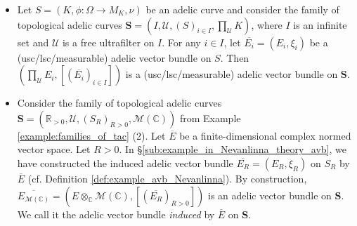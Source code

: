 \documentclass [11pt,reqno]{amsart}
\def\bC{{\mathbb{C}}}
\def\bR{{\mathbb{R}}}
\newcommand{\1}{\mathmybb{1}}
\def\cM{{\mathcal{M}}}
\def\cU{{\mathcal{U}}}
\begin{document}
\begin{example}
\label{example:adelic_vector_bundles_families_tac}
\begin{itemize}
	\item[(1)] Let $S=(K,\phi:\Omega\to M_{K},\nu)$ be an adelic curve and consider the family of topological adelic curves $\mathbf{S}=(I,\cU,(S)_{i\in I},\prod_{\cU}K)$, where $I$ is an infinite set and $\cU$ is a free ultrafilter on $I$. For any $i\in I$, let $\overline{E_{i}}=(E_{i},\xi_{i})$ be a (usc/lsc/measurable) adelic vector bundle on $S$. Then $(\prod_{\cU}E_{i},[(\overline{E_{i}})_{i\in I}])$ is a (usc/lsc/measurable) adelic vector bundle on $\mathbf{S}$.
	\item[(2)] Consider the family of topological adelic curves $\mathbf{S}=(\bR_{>0},\cU,(S_{R})_{R>0},\cM(\bC))$ from Example \ref{example:families_of_tac} (2). Let $\overline{E}$ be a finite-dimensional complex normed vector space. Let $R>0$. In \S \ref{sub:example_in_Nevanlinna_theory_avb}, we have constructed the induced adelic vector bundle $\overline{E_R}=(E_R,\xi_R)$ on $S_R$ by $\overline{E}$ (cf. Definition \ref{def:example_avb_Nevanlinna}). By construction, $\overline{E_{\cM(\bC)}}=(E\otimes_{\bC}\cM(\bC),[(\overline{E_{R}})_{R>0}])$ is an adelic vector bundle on $\mathbf{S}$. We call it the adelic vector bundle \emph{induced} by $\overline{E}$ on $\mathbf{S}$.
\end{itemize}
\end{example}
\end{document}
